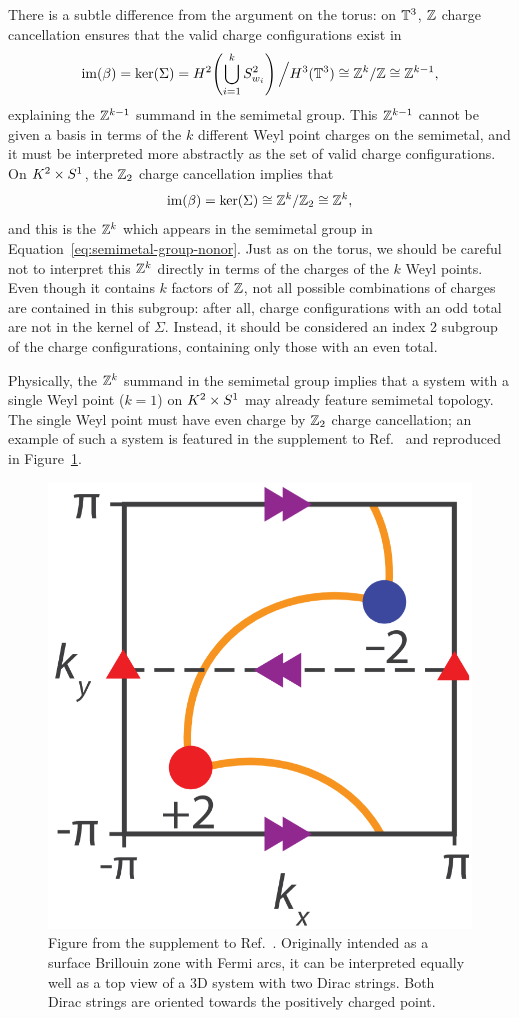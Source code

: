 There is a subtle difference from the argument on the torus: on $\mathbb{T}^3$, $\mathbb{Z}$ charge cancellation ensures that the valid charge configurations exist in 
\begin{equation*}
	\operatorname{im}(\beta) = \ker(\Sigma) = H^2\!\left(\bigcup_{i=1}^k S_{w_i}^2\right)\Big/H^3(\mathbb{T}^3) \cong \mathbb{Z}^k/\mathbb{Z} \cong \mathbb{Z}^{k-1},
\end{equation*}
explaining the $\mathbb{Z}^{k-1}$ summand in the semimetal group. This $\mathbb{Z}^{k-1}$ cannot be given a basis in terms of the $k$ different Weyl point charges on the semimetal, and it must be interpreted more abstractly as the set of valid charge configurations. On $K^2\times S^1$, the $\mathbb{Z}_2$ charge cancellation implies that
\begin{equation*}
	\operatorname{im}(\beta)=\ker(\Sigma)\cong\mathbb{Z}^k/\mathbb{Z}_2\cong\mathbb{Z}^k,
\end{equation*}
and this is the $\mathbb{Z}^k$ which appears in the semimetal group in Equation~\eqref{eq:semimetal-group-nonor}. Just as on the torus, we should be careful not to interpret this $\mathbb{Z}^k$ directly in terms of the charges of the $k$ Weyl points. Even though it contains $k$ factors of $\mathbb{Z}$, not all possible combinations of charges are contained in this subgroup: after all, charge configurations with an odd total are not in the kernel of $\Sigma$. Instead, it should be considered an index 2 subgroup of the charge configurations, containing only those with an even total.

Physically, the $\mathbb{Z}^k$ summand in the semimetal group implies that a system with a single Weyl point ($k=1$) on $K^2\times S^1$ may already feature semimetal topology. The single Weyl point must have even charge by $\mathbb{Z}_2$ charge cancellation; an example of such a system is featured in the supplement to Ref.~\cite{Fonseca-Vaidya_nonorientable} and reproduced in Figure~\ref{fig:double-points}.
\begin{figure}[htb!]
	\centering
	\includegraphics[width=.4\linewidth]{Images/double-points}
	\caption{Figure from the supplement to Ref.~\cite{Fonseca-Vaidya_nonorientable}. Originally intended as a surface Brillouin zone with Fermi arcs, it can be interpreted equally well as a top view of a 3D system with two Dirac strings. Both Dirac strings are oriented towards the positively charged point.} %
	\label{fig:double-points}
\end{figure}

